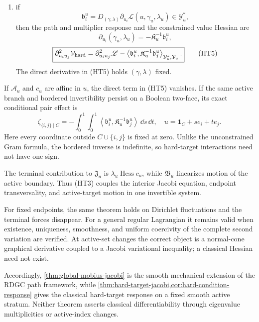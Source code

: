 \begin{theorem}
\begin{enumerate}[leftmargin=*,itemsep=0.3em]
  \item if
  \[
    \mathfrak b_i^u
    =D_{(\gamma,\lambda)}\partial_{u_i}\mathscr L
      (u,\gamma_u,\lambda_u)\in\mathcal Y_u^*,
  \]
  then the path and multiplier response and the constrained value Hessian are
  \begin{equation}
    \boxed{
    \partial_{u_i}(\gamma_u,\lambda_u)
    =-\mathfrak K_u^{-1}\mathfrak b_i^u,}
    \tag{HT4}
  \end{equation}
  \begin{equation}
    \boxed{
    \partial_{u_i u_j}^2\mathcal V_{\rm hard}
    =\partial_{u_i u_j}^2\mathscr L
    -\left\langle
      \mathfrak b_i^u,\mathfrak K_u^{-1}\mathfrak b_j^u
    \right\rangle_{\mathcal Y_u^*,\mathcal Y_u}.}
    \tag{HT5}
  \end{equation}
  The direct derivative in \textup{(HT5)} holds \((\gamma,\lambda)\) fixed.
\end{enumerate}
If \(\mathcal A_u\) and \(c_u\) are affine in \(u\), the direct term in
\textup{(HT5)} vanishes.  If the same active branch and bordered
invertibility persist on a Boolean two-face, its exact conditional pair
effect is
\begin{equation}
  \boxed{
  \zeta_{\{i,j\}\mid C}
  =-\int_0^1\!\int_0^1
  \left\langle
  \mathfrak b_i^u,\mathfrak K_u^{-1}\mathfrak b_j^u
  \right\rangle\,\dd s\,\dd t,\quad
  u=\mathbf1_C+se_i+te_j.}
  \tag{HT6}
\end{equation}
Here every coordinate outside \(C\cup\{i,j\}\) is fixed at zero.
Unlike the unconstrained Gram formula, the bordered inverse is indefinite, so
hard-target interactions need not have one sign.
\end{theorem}

The terminal contribution to \(\mathfrak J_u\) is
\(\lambda_u\operatorname{Hess}c_u\), while
\(\mathfrak B_u\) linearizes motion of the active boundary.  Thus
\textup{(HT3)} couples the interior Jacobi equation, endpoint transversality,
and active-target motion in one invertible system.

For fixed endpoints, the same theorem holds on Dirichlet fluctuations and the
terminal forces disappear.  For a general regular Lagrangian it remains valid
when existence, uniqueness, smoothness, and uniform coercivity of the complete
second variation are verified.  At active-set changes the correct object is a
normal-cone graphical derivative coupled to a Jacobi variational inequality;
a classical Hessian need not exist.

Accordingly, \cref{thm:global-mobius-jacobi} is the smooth mechanical
extension of the RDGC path framework, while
\cref{thm:hard-target-jacobi,cor:hard-condition-response} gives the classical
hard-target response on a fixed smooth active stratum.  Neither theorem
asserts classical differentiability through eigenvalue multiplicities or
active-index changes.

